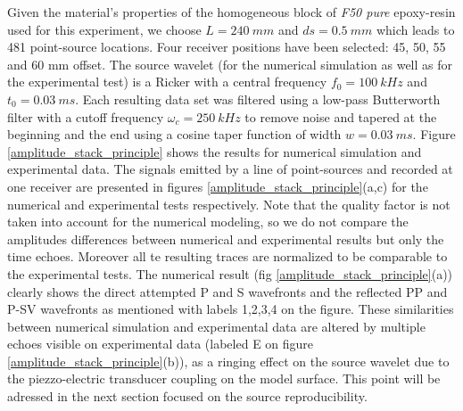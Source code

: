 \documentclass[manuscript,revised]{geophysics}
\begin{document}
\noindent Given the material's properties of the homogeneous block of \textit{F50 pure} epoxy-resin used for this experiment, we choose $L=240\ mm$ and $ds=0.5\ mm$ which leads to 481 point-source locations. Four receiver positions have been selected: 45, 50, 55 and 60 mm offset. The source wavelet (for the numerical simulation as well as for the experimental test) is a Ricker with a central frequency $f_{0}=100\ kHz$ and $t_{0}=0.03\ ms$. Each resulting data set was filtered using a low-pass Butterworth filter with a cutoff frequency $\omega_{c}=250\ kHz$ to remove noise and tapered at the beginning and the end using a cosine taper function of width $w=0.03\ ms$. Figure \ref{amplitude_stack_principle} shows the results for numerical simulation and experimental data. The signals emitted by a line of point-sources and recorded at one receiver are presented in figures \ref{amplitude_stack_principle}(a,c) for the numerical and experimental tests respectively.  Note that the quality factor is not taken into account for the numerical modeling, so we do not compare the amplitudes differences between numerical and experimental results but only the time echoes. Moreover all te resulting traces are normalized to be comparable to the experimental tests. The numerical result (fig \ref{amplitude_stack_principle}(a)) clearly shows the direct attempted P and S wavefronts and the reflected PP and P-SV wavefronts as mentioned with labels 1,2,3,4 on the figure. These similarities between numerical simulation and experimental data are altered by multiple echoes visible on experimental data (labeled E on figure \ref{amplitude_stack_principle}(b)), as a ringing effect on the source wavelet due to the piezzo-electric transducer coupling on the model surface. This point will be adressed in the next section focused on the source reproducibility.   
\end{document}
